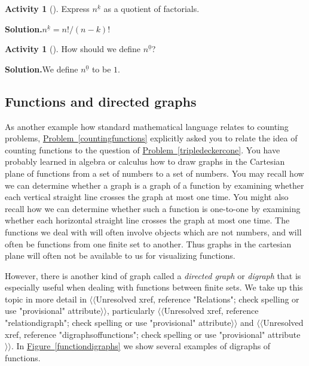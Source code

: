 \documentclass[10pt,]{book}
\theoremstyle{plain}
\theoremstyle{definition}
\newtheorem{activity}[project]{Activity}
\numberwithin{equation}{chapter}
\begin{document}
\begin{activity}[]\label{activity-21}
Express \(n^{\underline{k}}\) as a quotient of factorials.%
\par\medskip\noindent%
\textbf{Solution.}\quad \(n^{\underline{k}}=n!/(n-k)!\)%
\end{activity}
\begin{activity}[]\label{activity-22}
How should we define \(n^{\underline{0}}\)?%
\par\medskip\noindent%
\textbf{Solution.}\quad We define \(n^{\underline{0}}\) to be \(1\).%
\end{activity}
\typeout{************************************************}
\typeout{************************************************}
\subsection[{Functions and directed graphs}]{Functions and directed graphs}\label{subsection-2}
As another example how standard mathematical language relates to counting problems, \hyperref[countingfunctions]{Problem~\ref{countingfunctions}} explicitly asked you to relate the idea of counting functions to the question of \hyperref[tripledeckercone]{Problem~\ref{tripledeckercone}}. You have probably learned in algebra or calculus how to draw graphs in the Cartesian plane of functions from a set of numbers to a set of numbers. You may recall how we can determine whether a graph is a graph of a function by examining whether each vertical straight line crosses the graph at most one time. You might also recall how we can determine whether such a function is one-to-one by examining whether each horizontal straight line crosses the graph at most one time. The functions we deal with will often involve objects which are not numbers, and will often be functions from one finite set to another. Thus graphs in the cartesian plane will often not be available to us for visualizing functions.%
\par
However, there is another kind of graph called a \emph{directed graph} or \emph{digraph} that is especially useful when dealing with functions between finite sets. We take up this topic in more detail in {$\langle\langle$Unresolved xref, reference "Relations"; check spelling or use "provisional" attribute$\rangle\rangle$}, particularly {$\langle\langle$Unresolved xref, reference "relationdigraph"; check spelling or use "provisional" attribute$\rangle\rangle$} and {$\langle\langle$Unresolved xref, reference "digraphsoffunctions"; check spelling or use "provisional" attribute$\rangle\rangle$}. In \hyperref[functiondigraphs]{Figure~\ref{functiondigraphs}} we show several examples of digraphs of functions.%
\end{document}
